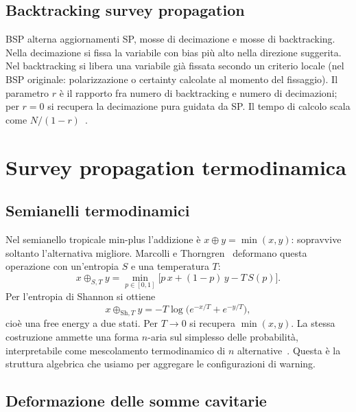 \documentclass{article}
\begin{document}
\subsection{Backtracking survey propagation}

BSP alterna aggiornamenti SP, mosse di decimazione e mosse di backtracking.
Nella decimazione si fissa la variabile con bias pi\`u alto nella direzione suggerita.
Nel backtracking si libera una variabile gi\`a fissata secondo un criterio locale (nel BSP originale: polarizzazione o certainty calcolate al momento del fissaggio).
Il parametro $r$ \`e il rapporto fra numero di backtracking e numero di decimazioni; per $r=0$ si recupera la decimazione pura guidata da SP.
Il tempo di calcolo scala come $N/(1-r)$~\cite{marino2016bsp}.

\section{Survey propagation termodinamica}
\label{sec:thermo}

\subsection{Semianelli termodinamici}

Nel semianello tropicale min-plus l'addizione \`e $x\oplus y=\min(x,y)$: sopravvive soltanto l'alternativa migliore.
Marcolli e Thorngren~\cite{marcolli2014thermodynamic} deformano questa operazione con un'entropia $S$ e una temperatura $T$:
\begin{equation}
  x\oplus_{S,T}y
  =\min_{p\in[0,1]}
  \bigl[p\,x+(1-p)\,y-T\,S(p)\bigr].
\end{equation}
Per l'entropia di Shannon si ottiene
\begin{equation}
  x\oplus_{\mathrm{Sh},T}y
  =-T\log\bigl(e^{-x/T}+e^{-y/T}\bigr),
\end{equation}
cio\`e una free energy a due stati.
Per $T\to 0$ si recupera $\min(x,y)$.
La stessa costruzione ammette una forma $n$-aria sul simplesso delle probabilit\`a, interpretabile come mescolamento termodinamico di $n$ alternative~\cite{marcolli2014thermodynamic}.
Questa \`e la struttura algebrica che usiamo per aggregare le configurazioni di warning.

\subsection{Deformazione delle somme cavitarie}
\end{document}
